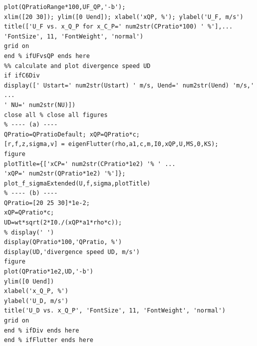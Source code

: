\documentclass{article}
\begin{document}
\begin{lstlisting}[caption={Main analysis script for Homework 1.}, label={lst:main_script}]
plot(QPratioRange*100,UF_QP,'-b');
xlim([20 30]); ylim([0 Uend]); xlabel('xQP, %'); ylabel('U_F, m/s')
title(['U_F vs. x_Q_P for x_C_P=' num2str(CPratio*100) ' %'],...
'FontSize', 11, 'FontWeight', 'normal')
grid on
end % ifUFvsQP ends here
%% calculate and plot divergence speed UD
if ifC6Div
display([' Ustart=' num2str(Ustart) ' m/s, Uend=' num2str(Uend) 'm/s,' ...
' NU=' num2str(NU)])
close all % close all figures
% ---- (a) ----
QPratio=QPratioDefault; xQP=QPratio*c;
[r,f,z,sigma,v] = eigenFlutter(rho,a1,c,m,I0,xQP,U,MS,0,KS);
figure
plotTitle={['xCP=' num2str(CPratio*1e2) '% ' ...
'xQP=' num2str(QPratio*1e2) '%']};
plot_f_sigmaExtended(U,f,sigma,plotTitle)
% ---- (b) ----
QPratio=[20 25 30]*1e-2;
xQP=QPratio*c;
UD=wt*sqrt(2*I0./(xQP*a1*rho*c));
% display(' ')
display(QPratio*100,'QPratio, %')
display(UD,'divergence speed UD, m/s')
figure
plot(QPratio*1e2,UD,'-b')
ylim([0 Uend])
xlabel('x_Q_P, %')
ylabel('U_D, m/s')
title('U_D vs. x_Q_P', 'FontSize', 11, 'FontWeight', 'normal')
grid on
end % ifDiv ends here
end % ifFlutter ends here




\end{lstlisting}
\end{document}
